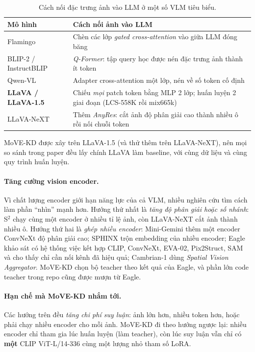 \documentclass[11pt,a4paper]{article}
\begin{document}
\begin{table}[H]
\centering
\caption{Cách nối đặc trưng ảnh vào LLM ở một số VLM tiêu biểu.}
\label{tab:vlm}
\begin{tabularx}{\linewidth}{@{}lX@{}}
\toprule
Mô hình & Cách nối ảnh vào LLM \\
\midrule
Flamingo \cite{flamingo} & Chèn các lớp \emph{gated cross-attention} vào giữa LLM đóng băng \\
BLIP-2 / InstructBLIP \cite{blip2} & \emph{Q-Former}: tập query học được nén đặc trưng ảnh thành ít token \\
Qwen-VL \cite{qwenvl} & Adapter cross-attention một lớp, nén về số token cố định \\
\textbf{LLaVA / LLaVA-1.5} \cite{llava} & Chiếu \emph{mọi} patch token bằng MLP 2 lớp; huấn luyện 2 giai đoạn (LCS-558K rồi mix665k) \\
LLaVA-NeXT & Thêm \emph{AnyRes}: cắt ảnh độ phân giải cao thành nhiều ô rồi nối chuỗi token \\
\bottomrule
\end{tabularx}
\end{table}

MoVE-KD được xây trên LLaVA-1.5 (và thử thêm trên LLaVA-NeXT), nên mọi so sánh trong paper đều lấy chính LLaVA làm baseline, với cùng dữ liệu và cùng quy trình huấn luyện.

\paragraph{Tăng cường vision encoder.} Vì chất lượng encoder giới hạn năng lực của cả VLM, nhiều nghiên cứu tìm cách làm phần ``nhìn'' mạnh hơn. Hướng thứ nhất là \emph{tăng độ phân giải hoặc số nhánh}: S$^2$ \cite{s2} chạy cùng một encoder ở nhiều tỉ lệ ảnh, còn LLaVA-NeXT cắt ảnh thành nhiều ô. Hướng thứ hai là \emph{ghép nhiều encoder}: Mini-Gemini \cite{minigemini} thêm một encoder ConvNeXt độ phân giải cao; SPHINX \cite{sphinx} trộn embedding của nhiều encoder; Eagle \cite{eagle} khảo sát có hệ thống việc kết hợp CLIP, ConvNeXt, EVA-02, Pix2Struct, SAM và cho thấy chỉ cần nối kênh đã hiệu quả; Cambrian-1 \cite{cambrian} dùng \emph{Spatial Vision Aggregator}. MoVE-KD chọn bộ teacher theo kết quả của Eagle, và phần lớn code teacher trong repo cũng được mượn từ Eagle.

\paragraph{Hạn chế mà MoVE-KD nhắm tới.} Các hướng trên đều \emph{tăng chi phí suy luận}: ảnh lớn hơn, nhiều token hơn, hoặc phải chạy nhiều encoder cho mỗi ảnh. MoVE-KD đi theo hướng ngược lại: nhiều encoder chỉ tham gia lúc huấn luyện (làm teacher), còn lúc suy luận vẫn chỉ có \textbf{một} CLIP ViT-L/14-336 cùng một lượng nhỏ tham số LoRA.
\end{document}
